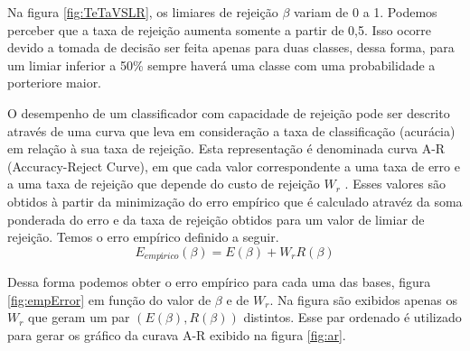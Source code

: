 \documentclass[ 
	article,			%
	11pt,				%
	oneside,			%
	a4paper,			%
	english,			%
	brazil,				%
	]{abntex2}
\begin{document}
Na figura \ref{fig:TeTaVSLR}, os limiares de rejeição $\beta$ variam de 0 a 1.
Podemos perceber que a taxa de rejeição aumenta somente a partir de 0,5. Isso ocorre
devido a tomada de decisão ser feita apenas para duas classes, dessa forma, para
um limiar inferior a 50\% sempre haverá uma classe com uma probabilidade a
porteriore maior.

O desempenho de um classificador com capacidade de rejeição pode ser descrito através de
uma curva que leva em consideração a taxa de classificação (acurácia) em relação à sua taxa de
rejeição. Esta representação é denominada curva A-R (Accuracy-Reject Curve), em que cada
valor correspondente a uma taxa de erro e a uma taxa de rejeição que depende do custo de
rejeição $W_r$ \cite{AJALMAR}. Esses valores são obtidos à partir da minimização
do erro empírico que é calculado atravéz da soma ponderada do erro e da taxa de
rejeição obtidos para um valor de limiar de rejeição. Temos o erro
empírico definido a seguir.
\begin{equation}
	E_{empírico}(\beta) = E(\beta) + W_r R(\beta) 
\end{equation}

Dessa forma podemos obter o erro empírico para cada uma das bases, figura
\ref{fig:empError} em função do valor de $\beta$ e de $W_r$. Na figura são
exibidos apenas os $W_r$ que geram um par $(E(\beta),R(\beta))$ distintos. Esse
par ordenado é utilizado para gerar os gráfico da curava A-R exibido na figura
\ref{fig:ar}.
\end{document}
